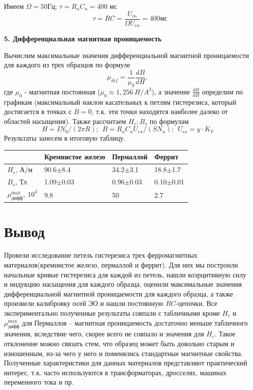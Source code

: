 \documentclass[a4paper, 12pt]{article}
\begin{document}
Имеем $\Omega=50$Гц; $\tau=R_uC_u=400 \text{ мс}$ $$~~~\tau=RC=\frac{U_{in}}{\Omega U_{ex}}=400 \text{мс}$$



\begin{center}
\textbf{5. Дифференциальная магнитная проницаемость}
\end{center}


Вычислим максимальные значения дифференциальной магнитной проницаемости  для каждого из трех образцов по формуле
$$\mu_{dif}=\frac{1}{\mu_0}\frac{dB}{dH},$$
где $\mu_0$ - магнитная постоянная ($\mu_0\approx1,256~ H/A^2$), а значение $\frac{dB}{dH}$ определим по графикам (максимальный наклон касательных к петлям гистерезиса, который достигается в точках с $B=0$, т.к. эти точки находятся наиболее далеко от областей насыщения). Также рассчитаем $H_c; B_s$ по формулам 
$$H=IN_0/(2\pi R);~~ B=R_u C_u U_{ex}/(SN_u);~~ U_{ex} = y\cdot K_Y$$
Результаты занесем в итоговую таблицу. 


\begin{table}[h]\centering
	\begin{tabular}{|m{3.3cm}|m{2.7cm}|m{2.7cm}|m{2.7cm}|}
		\hline
		~&Кремнистое железо&Пермаллой&Феррит\\
		\hline
		$H_c$, А/м&90.6$\pm$8.4&34.2$\pm$3.1&18.8$\pm$1.7\\
		\hline
		$B_s$, Тл&1.09$\pm$0.03&0.96$\pm$0.03&0.10$\pm$0.01\\
		\hline
		$\mu_{\text{дифф}}^{\max},~10^3$&9.8&50&2.7\\
		\hline
	\end{tabular}
\end{table}
\newpage
\section{Вывод}
Провели исследование петель гистерезиса трех ферромагнитных материалов(кремнистое железо, пермаллой и феррит). Для них мы построили начальные кривые гистерезиса для каждой из петель, нашли коэрцитивную силу и индукцию насыщения для каждого образца, оценили максимальные значения дифференциальной магнитной проницаемости для каждого образца, а также произвели калибровку осей ЭО и нашли постоянную $RC$-цепочки. Все экспериментально полученные результаты совпали с табличными кроме $H_c$ и $\mu_{\text{дифф}}^{\max}$ для Пермаллоя -- магнитная проницаемость достаточно меньше  табличного значения, вследствие чего, скорее всего не совпало и значения для $H_c$. Такое отклонение можно связать стем, что образец может быть довольно старым и изношенным, из-за чего у него и поменялись стандартные магнитные свойства. Полученные характеристики для данных материалов представляют практический интерес, т.к. часто используются в трансформаторах, дросселях, машинах переменного тока и пр.
\end{document}
